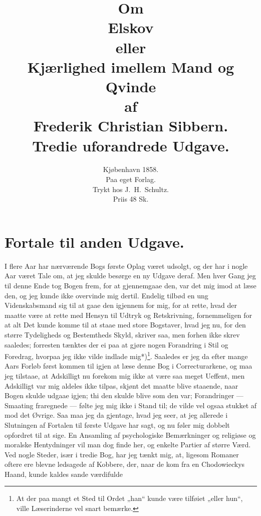 \documentclass[12pt,a4paper]{book}
\title{\textbf{Om}\\[6pt]
  \Huge\textbf{Elskov}\\[6pt]
  \large eller\\[6pt]
  \Large\textbf{Kjærlighed imellem Mand og Qvinde}\\[10pt]
  \normalsize af\\[6pt]
  \large Frederik Christian Sibbern.\\[16pt]
  \normalsize Tredie uforandrede Udgave.}
\author{}
\date{Kjøbenhavn 1858.\\
  Paa eget Forlag.\\
  Trykt hos J.\ H.\ Schultz.\\[6pt]
  Priis 48 Sk.}
\newcommand{\opage}[1]{\marginnote{\footnotesize\textit{[#1]}}}
\begin{document}
\maketitle
\thispagestyle{empty}
\cleardoublepage

\chapter*{Fortale til anden Udgave.}

\opage{III} I flere Aar har nærværende Bogs første Oplag været udsolgt, og der
har i nogle Aar været Tale om, at jeg skulde besørge en ny Udgave
deraf. Men hver Gang jeg til denne Ende tog Bogen frem, for at
gjennemgaae den, var det mig imod at læse den, og jeg kunde ikke
overvinde mig dertil. Endelig tilbød en ung Videnskabsmand sig til at
gaae den igjennem for mig, for at rette, hvad der maatte være at rette
med Hensyn til Udtryk og Retskrivning, fornemmeligen for at alt Det
kunde komme til at staae med store Bogstaver, hvad jeg nu, for den
større Tydeligheds og Bestemtheds Skyld, skriver saa, men forhen ikke
skrev saaledes; forresten tænktes der ei paa at gjøre nogen Forandring
i Stil og Foredrag, hvorpaa jeg ikke vilde indlade mig*)\footnote{At der
paa mangt et Sted til Ordet „han“ kunde være tilføiet „eller hun“,
ville Læserinderne vel snart bemærke.}. Saaledes er jeg da efter mange
Aars Forløb først kommen til igjen at læse denne Bog i Correcturarkene,
og maa jeg tilstaae, at Adskilligt nu forekom mig ikke at være saa
meget Ueffent, men Adskilligt var mig aldeles ikke tilpas, skjønt det
maatte blive staaende, naar Bogen skulde udgaae igjen; thi den skulde
blive \opage{IV} som den var; Forandringer --- Smaating fraregnede --- følte jeg
mig ikke i Stand til; de vilde vel ogsaa stukket af mod det Øvrige.
Saa maa jeg da gjentage, hvad jeg seer, at jeg allerede i Slutningen af
Fortalen til første Udgave har sagt, og nu føler mig dobbelt opfordret
til at sige. En Ansamling af psychologiske Bemærkninger og religiøse
og moralske Hentydninger vil man dog finde her, og enkelte Partier af
større Værd. Ved nogle Steder, især i tredie Bog, har jeg tænkt mig,
at, ligesom Romaner oftere ere blevne ledsagede af Kobbere, der, naar
de kom fra en Chodowieckys Haand, kunde kaldes sande værdifulde
\end{document}
